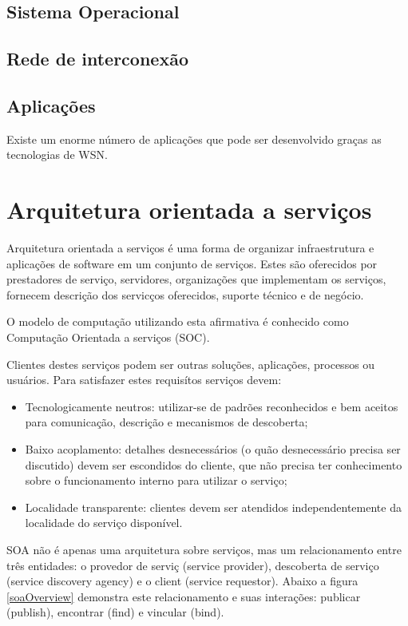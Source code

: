 \subsection{Sistema Operacional}

\subsection{Rede de interconex\~ao}

\subsection{Aplica\c{c}\~oes}

Existe um enorme n\'umero de aplica\c{c}\~oes que pode ser desenvolvido gra\c{c}as as tecnologias de WSN.


\section{Arquitetura orientada a servi\c{c}os}

Arquitetura orientada a servi\c{c}os \'e uma forma de organizar infraestrutura e aplica\c{c}\~oes de software em um conjunto de servi\c{c}os. Estes s\~ao oferecidos por prestadores de servi\c{c}o, servidores, organiza\c{c}\~oes que implementam os servi\c{c}os, fornecem descri\c{c}\~ao dos servic\c{c}os oferecidos, suporte t\'ecnico e de neg\'ocio.

O modelo de computa\c{c}\~ao utilizando esta afirmativa \'e conhecido como Computa\c{c}\~ao Orientada a servi\c{c}os (SOC). \cite{581580}

Clientes destes servi\c{c}os podem ser outras solu\c{c}\~oes, aplica\c{c}\~oes, processos ou usu\'arios. Para satisfazer estes requis\'itos servi\c{c}os devem:
\begin{itemize}
\item Tecnologicamente neutros: utilizar-se de padr\~oes reconhecidos e bem aceitos para comunica\c{c}\~ao, descri\c{c}\~ao e mecanismos de descoberta;
\item Baixo acoplamento: detalhes desnecess\'arios (o qu\~ao desnecess\'ario precisa ser discutido) devem ser escondidos do cliente, que n\~ao precisa ter conhecimento sobre o funcionamento interno para utilizar o servi\c{c}o;
\item Localidade transparente: clientes devem ser atendidos independentemente da localidade do servi\c{c}o dispon\'ivel.
\end{itemize}

SOA n\~ao \'e apenas uma arquitetura sobre servi\c{c}os, mas um relacionamento entre tr\^es entidades: o provedor de servi\c{c} (service provider), descoberta de servi\c{c}o (service discovery agency) e o client (service requestor).  Abaixo a figura \ref{soaOverview} demonstra este relacionamento e suas intera\c{c}\~oes: publicar (publish), encontrar (find) e vincular (bind).

